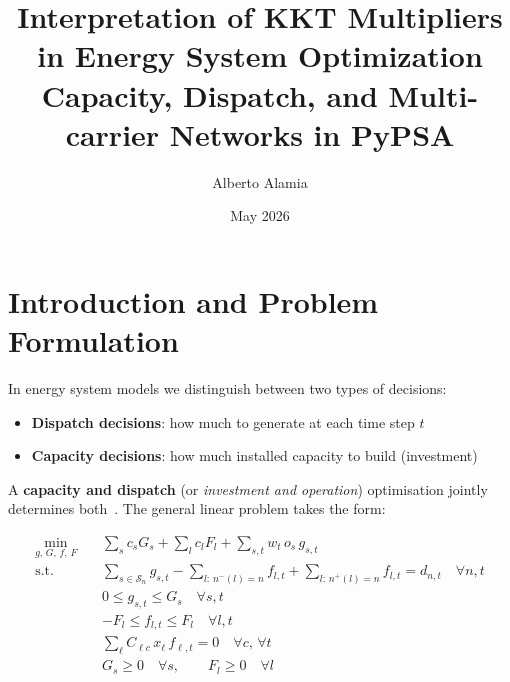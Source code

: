 \documentclass{article}
\title{Interpretation of KKT Multipliers in Energy System Optimization\\
\large Capacity, Dispatch, and Multi-carrier Networks in PyPSA}
\author{Alberto Alamia}
\date{May 2026}
\begin{document}
\maketitle
\tableofcontents
\newpage

\section{Introduction and Problem Formulation}
\label{sec:intro}

In energy system models we distinguish between two types of decisions:
\begin{itemize}
    \item \textbf{Dispatch decisions}: how much to generate at each time step $t$
    \item \textbf{Capacity decisions}: how much installed capacity to build (investment)
\end{itemize}

A \textbf{capacity and dispatch} (or \emph{investment and operation}) optimisation jointly
determines both~\cite{Stoft2002,Kirschen2004}. The general linear problem takes the form:

\begin{align}
\min_{g,\, G,\, f,\, F} \quad
    & \sum_{s} c_s G_s + \sum_{l} c_l F_l
      + \sum_{s,t} w_t \, o_s \, g_{s,t} \label{eq:obj} \\
\text{s.t.} \quad
    & \sum_{s \in \mathcal{S}_n} g_{s,t}
      - \sum_{l:\, n^-(l)=n} f_{l,t}
      + \sum_{l:\, n^+(l)=n} f_{l,t}
      = d_{n,t}
      \quad \forall n,t \label{eq:balance} \\
    & 0 \le g_{s,t} \le G_s
      \quad \forall s,t \label{eq:dispatch_limit} \\
    & -F_l \le f_{l,t} \le F_l
      \quad \forall l,t \label{eq:flow_limit} \\
    & \sum_{\ell} C_{\ell c}\, x_\ell\, f_{\ell,t} = 0
      \quad \forall c,\, \forall t \label{eq:kvl} \\
    & G_s \ge 0 \quad \forall s, \qquad F_l \ge 0 \quad \forall l
\end{align}
\end{document}
